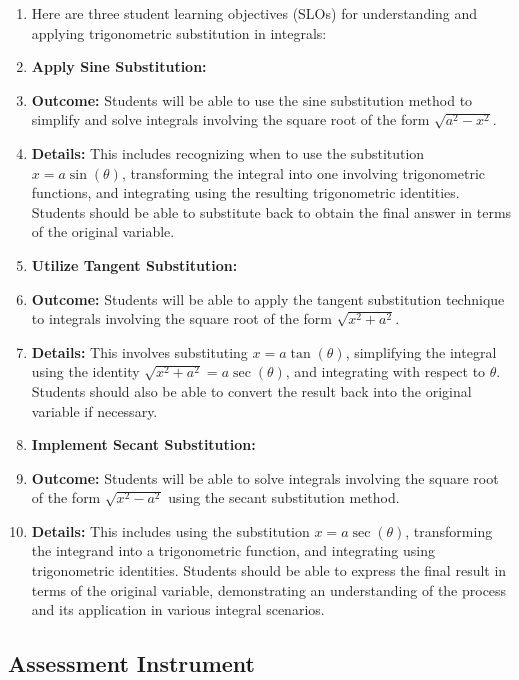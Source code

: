 \begin{enumerate}
    \item Here are three student learning objectives (SLOs) for understanding and applying trigonometric substitution in integrals:
    \item \textbf{Apply Sine Substitution:}
    \item \textbf{Outcome:} Students will be able to use the sine substitution method to simplify and solve integrals involving the square root of the form $\sqrt{a^2 - x^2}$.
    \item \textbf{Details:} This includes recognizing when to use the substitution $x = a \sin(\theta)$, transforming the integral into one involving trigonometric functions, and integrating using the resulting trigonometric identities. Students should be able to substitute back to obtain the final answer in terms of the original variable.
    \item \textbf{Utilize Tangent Substitution:}
    \item \textbf{Outcome:} Students will be able to apply the tangent substitution technique to integrals involving the square root of the form $\sqrt{x^2 + a^2}$.
    \item \textbf{Details:} This involves substituting $x = a \tan(\theta)$, simplifying the integral using the identity $\sqrt{x^2 + a^2} = a \sec(\theta)$, and integrating with respect to $\theta$. Students should also be able to convert the result back into the original variable if necessary.
    \item \textbf{Implement Secant Substitution:}
    \item \textbf{Outcome:} Students will be able to solve integrals involving the square root of the form $\sqrt{x^2 - a^2}$ using the secant substitution method.
    \item \textbf{Details:} This includes using the substitution $x = a \sec(\theta)$, transforming the integrand into a trigonometric function, and integrating using trigonometric identities. Students should be able to express the final result in terms of the original variable, demonstrating an understanding of the process and its application in various integral scenarios.
\end{enumerate}

\subsection{Assessment Instrument}

